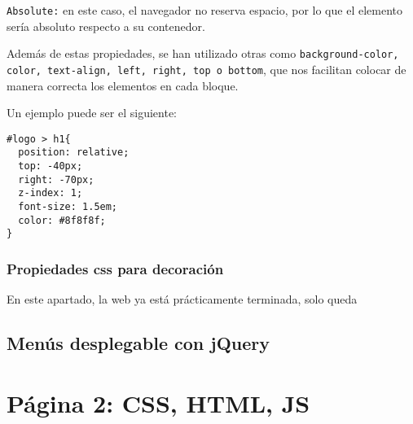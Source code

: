 \documentclass[10pt,a4paper]{article}
\begin{document}

\texttt{Absolute:} en este caso, el navegador no reserva espacio, por lo que el elemento sería absoluto respecto a su contenedor.

Además de estas propiedades, se han utilizado otras como \texttt{background-color, color, text-align, left, right, top o bottom}, que nos facilitan colocar de manera correcta los elementos en cada bloque.

Un ejemplo puede ser el siguiente:

\begin{verbatim}
#logo > h1{
  position: relative;
  top: -40px;
  right: -70px;
  z-index: 1;
  font-size: 1.5em;
  color: #8f8f8f;
}
\end{verbatim}

\subsubsection{Propiedades css para decoración}

En este apartado, la web ya está prácticamente terminada, solo queda 

\subsection{Menús desplegable con jQuery}

\section{Página 2: CSS, HTML, JS}
\end{document}
